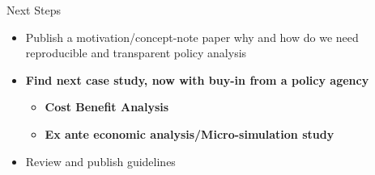 \documentclass{beamer}
\begin{document}
\begin{frame}{Next Steps}

\begin{itemize}
\item Publish a motivation/concept-note paper why and how do we need reproducible and transparent policy analysis
\item{\textbf{Find next case study, now with buy-in from a policy agency}}
\begin{itemize}
\item \textbf{Cost Benefit Analysis}
\item \textbf{Ex ante economic analysis/Micro-simulation study}
\end{itemize}
\item Review and publish guidelines
\end{itemize}
\end{frame}
\end{document}
